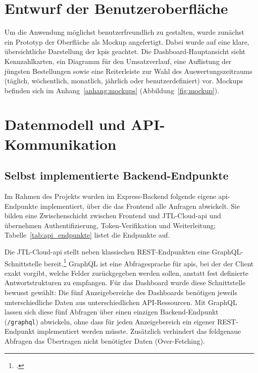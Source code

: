 \documentclass[11pt, a4paper, oneside]{report}
\begin{document}
\section{Entwurf der Benutzeroberfläche}

Um die Anwendung möglichst benutzerfreundlich zu gestalten, wurde zunächst ein Prototyp
der Oberfläche als Mockup angefertigt. Dabei wurde auf eine klare, übersichtliche
Darstellung der \glspl{kpi} geachtet. Die Dashboard-Hauptansicht sieht
Kennzahlkarten, ein Diagramm für den Umsatzverlauf, eine Auflistung der jüngsten
Bestellungen sowie eine Reiterleiste zur Wahl des Auswertungszeitraums (täglich,
wöchentlich, monatlich, jährlich oder benutzerdefiniert) vor. Mockups befinden sich
im Anhang~\ref{anhang:mockups} (Abbildung~\ref{fig:mockup}).

\section{Datenmodell und API-Kommunikation}

\subsection{Selbst implementierte Backend-Endpunkte}

Im Rahmen des Projekts wurden im Express-Backend folgende eigene \gls{api}-Endpunkte
implementiert, über die das Frontend alle Anfragen abwickelt. Sie bilden eine
Zwischenschicht zwischen Frontend und JTL-Cloud-\gls{api} und übernehmen
Authentifizierung, Token-Verifikation und Weiterleitung; Tabelle~\ref{tab:api_endpunkte}
listet die Endpunkte auf.

Die JTL-Cloud-\gls{api} stellt neben klassischen REST-Endpunkten eine
GraphQL-Schnittstelle bereit.\footcite{jtl_cloud_api} GraphQL ist eine Abfragesprache für \glspl{api},
bei der der Client exakt vorgibt, welche Felder zurückgegeben werden sollen,
anstatt fest definierte Antwortstrukturen zu empfangen. Für das Dashboard
wurde diese Schnittstelle bewusst gewählt: Die fünf Anzeigebereiche des
Dashboards benötigen jeweils unterschiedliche Daten aus unterschiedlichen
API-Ressourcen. Mit GraphQL lassen sich diese fünf Abfragen über einen
einzigen Backend-Endpunkt (\texttt{/graphql}) abwickeln, ohne dass für
jeden Anzeigebereich ein eigener REST-Endpunkt implementiert werden müsste.
Zusätzlich verhindert das feldgenaue Abfragen das Übertragen nicht benötigter
Daten (Over-Fetching).
\end{document}
